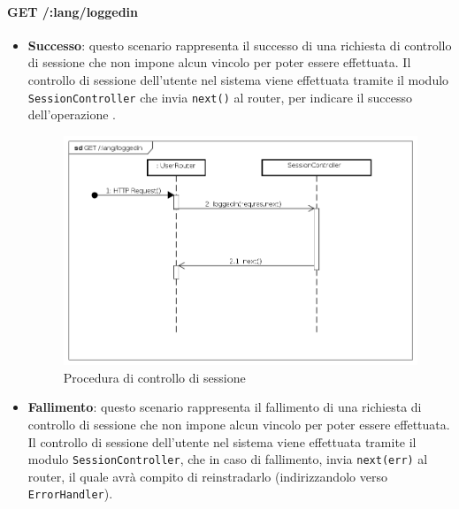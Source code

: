 \paragraph{GET /:lang/loggedin}
\begin{itemize}
\item \textbf{Successo}: questo scenario rappresenta il successo di una richiesta di controllo di sessione che non impone alcun vincolo per poter essere effettuata. Il controllo di sessione dell'utente nel sistema viene effettuata tramite il modulo \texttt{SessionController} che invia \texttt{next()} al router, per indicare il successo dell'operazione .

\label{Procedura di controllo di sessione}
\begin{figure}[ht]
	\centering
	\includegraphics[scale=0.40]{UML/DiagrammiDiSequenza/Back-end/GET__lang_loggedin_success.png}
	\caption{Procedura di controllo di sessione}
\end{figure}
\FloatBarrier
 
\item \textbf{Fallimento}: questo scenario rappresenta il fallimento di una richiesta di controllo di sessione che non impone alcun vincolo per poter essere effettuata. Il controllo di sessione dell'utente nel sistema viene effettuata tramite il modulo \texttt{SessionController}, che in caso di fallimento, invia \texttt{next(err)} al router,  il quale avrà compito di reinstradarlo (indirizzandolo verso \texttt{ErrorHandler}).


\end{itemize}
